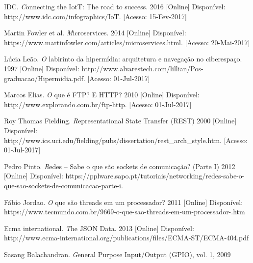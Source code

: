 \documentclass[journal]{IEEEtran}
\begin{document}
\begin{thebibliography}{1}
IDC. \emph Connecting the IotT: The road to success. 2016 [Online] Disponível: http://www.idc.com/infographics/IoT. [Acesso: 15-Fev-2017]

Martin Fowler et al. \emph Microservices. 2014 [Online] Disponível: https://www.martinfowler.com/articles/microservices.html. [Acesso: 20-Mai-2017]

Lúcia Leão. \emph O labirinto da hipermídia: arquitetura e navegação no ciberespaço. 1997 [Online]
Disponível:
http://www.alvarestech.com/lillian/Pos-graduacao/Hipermidia.pdf. [Acesso: 01-Jul-2017]


Marcos Elias. \emph O que é FTP? E HTTP? 2010 [Online]
Disponível: http://www.explorando.com.br/ftp-http. [Acesso: 01-Jul-2017]

Roy Thomas Fielding. \emph Representational State Transfer (REST) 2000 [Online] Disponível: http://www.ics.uci.edu/\~fielding/pubs/dissertation/rest\_arch\_style.htm.
[Acesso: 01-Jul-2017]

Pedro Pinto. \emph Redes – Sabe o que são sockets de comunicação? (Parte I) 2012 [Online] Disponível: https://pplware.sapo.pt/tutoriais/networking/redes-sabe-o-que-sao-sockets-de-comunicacao-parte-i.

Fábio Jordao. \emph O que são threads em um processador? 2011 [Online] Disponível: https://www.tecmundo.com.br/9669-o-que-sao-threads-em-um-processador-.htm

Ecma international. \emph The JSON Data. 2013 [Online] 
Disponível: http://www.ecma-international.org/publications/files/ECMA-ST/ECMA-404.pdf

Sasang Balachandran. \emph General Purpose
Input/Output (GPIO), vol. 1, 2009

\end{thebibliography}

% 
\end{document}
